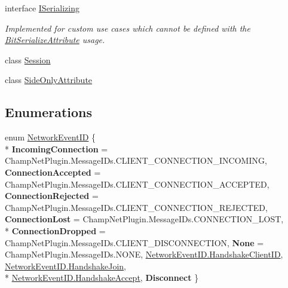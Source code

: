 \begin{DoxyCompactItemize}
interface \hyperlink{interface_skyrates_1_1_common_1_1_network_1_1_i_serializing}{I\-Serializing}
\begin{DoxyCompactList}\small\item\em Implemented for custom use cases which cannot be defined with the \hyperlink{class_skyrates_1_1_common_1_1_network_1_1_bit_serialize_attribute}{Bit\-Serialize\-Attribute} usage. \end{DoxyCompactList}\item 
class \hyperlink{class_skyrates_1_1_common_1_1_network_1_1_session}{Session}
\item 
class \hyperlink{class_skyrates_1_1_common_1_1_network_1_1_side_only_attribute}{Side\-Only\-Attribute}
\end{DoxyCompactItemize}
\subsection*{Enumerations}
\begin{DoxyCompactItemize}
\item 
enum \hyperlink{namespace_skyrates_1_1_common_1_1_network_a90fc6faa44c44b4284114e861d3e761a}{Network\-Event\-I\-D} \{ \\*
{\bfseries Incoming\-Connection} = Champ\-Net\-Plugin.\-Message\-I\-Ds.\-C\-L\-I\-E\-N\-T\-\_\-\-C\-O\-N\-N\-E\-C\-T\-I\-O\-N\-\_\-\-I\-N\-C\-O\-M\-I\-N\-G, 
{\bfseries Connection\-Accepted} = Champ\-Net\-Plugin.\-Message\-I\-Ds.\-C\-L\-I\-E\-N\-T\-\_\-\-C\-O\-N\-N\-E\-C\-T\-I\-O\-N\-\_\-\-A\-C\-C\-E\-P\-T\-E\-D, 
{\bfseries Connection\-Rejected} = Champ\-Net\-Plugin.\-Message\-I\-Ds.\-C\-L\-I\-E\-N\-T\-\_\-\-C\-O\-N\-N\-E\-C\-T\-I\-O\-N\-\_\-\-R\-E\-J\-E\-C\-T\-E\-D, 
{\bfseries Connection\-Lost} = Champ\-Net\-Plugin.\-Message\-I\-Ds.\-C\-O\-N\-N\-E\-C\-T\-I\-O\-N\-\_\-\-L\-O\-S\-T, 
\\*
{\bfseries Connection\-Dropped} = Champ\-Net\-Plugin.\-Message\-I\-Ds.\-C\-L\-I\-E\-N\-T\-\_\-\-D\-I\-S\-C\-O\-N\-N\-E\-C\-T\-I\-O\-N, 
{\bfseries None} = Champ\-Net\-Plugin.\-Message\-I\-Ds.\-N\-O\-N\-E, 
\hyperlink{namespace_skyrates_1_1_common_1_1_network_a90fc6faa44c44b4284114e861d3e761aa908d5d0d1dcdac6a031195157436dbc3}{Network\-Event\-I\-D.\-Handshake\-Client\-I\-D}, 
\hyperlink{namespace_skyrates_1_1_common_1_1_network_a90fc6faa44c44b4284114e861d3e761aae1ed8fdcd01caace5506395496004e93}{Network\-Event\-I\-D.\-Handshake\-Join}, 
\\*
\hyperlink{namespace_skyrates_1_1_common_1_1_network_a90fc6faa44c44b4284114e861d3e761aa687268a9c39eb0452e4bf727ebc788f0}{Network\-Event\-I\-D.\-Handshake\-Accept}, 
{\bfseries Disconnect}
 \}
\end{DoxyCompactItemize}
